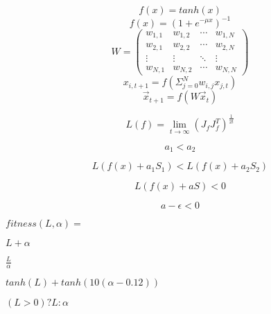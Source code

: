 \documentclass[12pt]{article}
\begin{document}
$$f(x) = tanh(x)$$
$$f(x) = (1 + e^{-\mu x})^{-1}$$
\[ W= \left( \begin{array}{cccc}
     w_{1,1} & w_{1,2} & \cdots & w_{1,N} \\
     w_{2,1} & w_{2,2} & \cdots & w_{2,N} \\
     \vdots  & \vdots  & \ddots & \vdots \\
     w_{N,1} & w_{N,2} & \cdots & w_{N,N} \end{array} \right)\]
$$x_{i,t+1} = f(\Sigma_{j=0}^{N} w_{i,j}x_{j,t})$$
$$\vec{x}_{t+1} = f(W \vec{x}_{t})$$

$$L(f) = \lim_{t\rightarrow \infty} (J_{f}J_{f}^{T})^{\frac{1}{2t}}$$

$$a_{1} < a_{2}$$

$$L( f(x) + a_{1}S_{1} ) < L( f(x) + a_{2}S_{2} )$$

$$L( f(x) + aS ) < 0$$

$$a - \epsilon < 0$$

$fitness(L, \alpha) =$

\vspace{20pt}

$L + \alpha$

\vspace{10pt}

$\frac{L}{\alpha}$

\vspace{10pt}

$tanh(L) + tanh( 10(\alpha - 0.12))$

\vspace{10pt}

$ (L > 0) ? L : \alpha$
\end{document}
